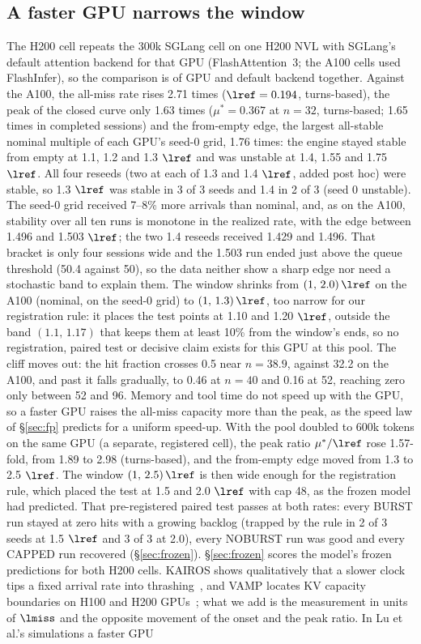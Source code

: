 \subsection{A faster GPU narrows the window}\label{sec:h200}
The H200 cell repeats the 300k SGLang cell on one H200 NVL with SGLang's default attention backend for that GPU (FlashAttention~3; the A100 cells used FlashInfer), so the comparison is of GPU and default backend together. Against the A100, the all-miss rate rises 2.71 times ($\lref=0.194$\sps, turns-based), the peak of the closed curve only 1.63 times ($\mu^*=0.367$\sps{} at $n=32$, turns-based; 1.65 times in completed sessions) and the from-empty edge, the largest all-stable nominal multiple of each GPU's seed-0 grid, 1.76 times: the engine stayed stable from empty at 1.1, 1.2 and 1.3 $\lref$ and was unstable at 1.4, 1.55 and 1.75 $\lref$. All four reseeds (two at each of 1.3 and 1.4 $\lref$, added post hoc) were stable, so 1.3 $\lref$ was stable in 3 of 3 seeds and 1.4 in 2 of 3 (seed 0 unstable). The seed-0 grid received 7--8\% more arrivals than nominal, and, as on the A100, stability over all ten runs is monotone in the realized rate, with the edge between 1.496 and 1.503 $\lref$; the two 1.4 reseeds received 1.429 and 1.496. That bracket is only four sessions wide and the 1.503 run ended just above the queue threshold (50.4 against 50), so the data neither show a sharp edge nor need a stochastic band to explain them. The window shrinks from $(1,\,2.0)\,\lref$ on the A100 (nominal, on the seed-0 grid) to $(1,\,1.3)\,\lref$, too narrow for our registration rule: it places the test points at 1.10 and 1.20 $\lref$, outside the band $(1.1,\,1.17)$ that keeps them at least 10\% from the window's ends, so no registration, paired test or decisive claim exists for this GPU at this pool. The cliff moves out: the hit fraction crosses 0.5 near $n=38.9$, against 32.2 on the A100, and past it falls gradually, to 0.46 at $n=40$ and 0.16 at 52, reaching zero only between 52 and 96. Memory and tool time do not speed up with the GPU, so a faster GPU raises the all-miss capacity more than the peak, as the speed law of \S\ref{sec:fp} predicts for a uniform speed-up. With the pool doubled to 600k tokens on the same GPU (a separate, registered cell), the peak ratio $\mu^*/\lref$ rose 1.57-fold, from 1.89 to 2.98 (turns-based), and the from-empty edge moved from 1.3 to 2.5 $\lref$. The window $(1,\,2.5)\,\lref$ is then wide enough for the registration rule, which placed the test at 1.5 and 2.0 $\lref$ with cap 48, as the frozen model had predicted. That pre-registered paired test passes at both rates: every BURST run stayed at zero hits with a growing backlog (trapped by the rule in 2 of 3 seeds at 1.5 $\lref$ and 3 of 3 at 2.0), every NOBURST run was good and every CAPPED run recovered (\S\ref{sec:frozen}). \S\ref{sec:frozen} scores the model's frozen predictions for both H200 cells. KAIROS shows qualitatively that a slower clock tips a fixed arrival rate into thrashing~\citep{yuan2026kairos}, and VAMP locates KV capacity boundaries on H100 and H200 GPUs~\citep{kim2026vamp}; what we add is the measurement in units of $\lmiss$ and the opposite movement of the onset and the peak ratio. In Lu et al.'s simulations a faster GPU 